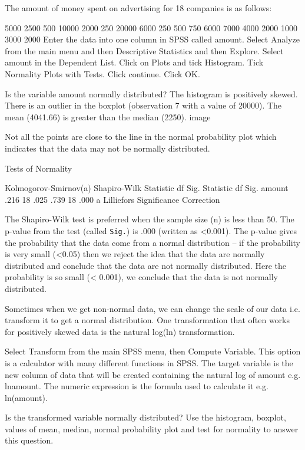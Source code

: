The amount of money spent on advertising for 18 companies is as follows:
 
      5000 2500      500     10000     2000    250   20000     6000     250
      500 750      6000    7000 4000   2000   1000      3000    2000   
Enter the data into one column in SPSS called amount. Select Analyze from the main menu and then Descriptive Statistics and then Explore. Select amount in the Dependent List. Click on Plots and tick Histogram. Tick Normality Plots with Tests. Click continue. Click OK.
 
Is the variable amount normally distributed? The histogram is positively skewed. There is an outlier in the boxplot (observation 7 with a value of 20000). The mean (4041.66) is greater than the median (2250). image
 
 
Not all the points are close to the line in the normal probability plot which indicates that the data may not be normally distributed.
 
Tests of Normality
 
 
 
 	
Kolmogorov-Smirnov(a)
Shapiro-Wilk
Statistic
df
Sig.
Statistic
df
Sig.
amount
.216
18
.025
.739
18
.000
a  Lilliefors Significance Correction
 
 
The Shapiro-Wilk test is preferred when the sample size (n) is less than 50. The p-value from the test (called \texttt{Sig.}) is .000 (written as <0.001). The p-value gives the probability that the data come from a normal distribution – if the probability is very small (<0.05) then we reject the idea that the data are normally distributed and conclude that the data are not normally distributed. Here the probability is so small (< 0.001), we conclude that the data is not normally distributed.
 
Sometimes when we get non-normal data, we can change the scale of our data i.e. transform it to get a normal distribution. One transformation that often works for positively skewed data is the natural log(ln) transformation.
 
Select Transform from the main SPSS menu, then Compute Variable. This option is a calculator with many different functions in SPSS. The target variable is the new column of data that will be created containing the natural log of amount e.g. lnamount. The numeric expression is the formula used to calculate it e.g. ln(amount).
 
Is the transformed variable normally distributed? Use the histogram, boxplot, values of mean, median, normal probability plot and test for normality to answer this question.
 

